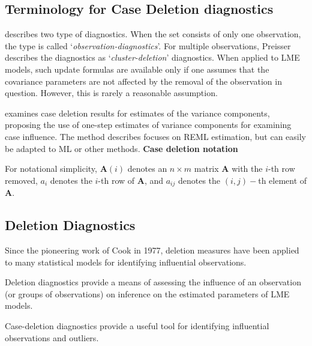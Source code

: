 \documentclass[12pt, a4paper]{report}
\theoremstyle{plain}
\theoremstyle{definition}
\theoremstyle{remark}
\begin{document}
	
	\subsection{Terminology for Case Deletion diagnostics} %
	
	\citet{preisser} describes two type of diagnostics. When the set consists of only one observation, the type is called
	`\textit{observation-diagnostics}'. For multiple observations, Preisser describes the diagnostics as `\textit{cluster-deletion}' diagnostics. When applied to LME models, such update formulas are available only if one assumes that the covariance parameters are not affected by the removal of the observation in question. However, this is rarely a reasonable assumption.
	
	\citet{Christensen}examines case deletion results for estimates of
	the variance components, proposing the use of one-step estimates
	of variance components for examining case influence. The method
	describes focuses on REML estimation, but can easily be adapted to
	ML or other methods.
	\noindent \textbf{Case deletion notation} %
	
	For notational simplicity, $\boldsymbol{A}(i)$ denotes an $n \times m$ matrix $\boldsymbol{A}$ with the $i$-th row
	removed, $a_i$ denotes the $i$-th row of $\boldsymbol{A}$, and $a_{ij}$ denotes the $(i, j)-$th element of $\boldsymbol{A}$.
	
\newpage
	\subsection{Deletion Diagnostics}
	
	Since the pioneering work of Cook in 1977, deletion measures have been applied to many statistical models for identifying influential observations.
	
	Deletion diagnostics provide a means of assessing the influence of an observation (or groups of observations) on inference on the estimated parameters of LME models.
	
	Case-deletion diagnostics provide a useful tool for identifying influential observations and outliers.
	
\end{document}

